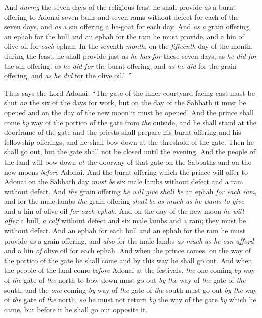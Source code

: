 \begin{biblechapter}
\verse And \textit{during} the seven days of the religious feast he shall provide \textit{as} a burnt offering to Adonai seven bulls and seven rams without defect for each of the seven days, and \textit{as} a sin offering a he-goat for each day.
\verse And \textit{as a} grain offering, an ephah for the bull and an ephah for the ram he must provide, and a hin of olive oil for \textit{each} ephah.
\verse In the seventh \textit{month}, on the \textit{fifteenth} day of the month, during the feast, he shall provide just as \textit{he has for} these seven days, as \textit{he did for} the sin offering, \textit{as he did for} the burnt offering, and \textit{as he did} for the grain offering, and \textit{as he did} for the olive oil.’ ”
\end{biblechapter}

\begin{biblechapter} %
\verse Thus says the Lord Adonai: “The gate of the inner courtyard facing east must be shut \textit{on} the six of the days for work, but on the day of the Sabbath it must be opened and on the day of the new moon it must be opened.
\verse And the prince shall come \textit{by} way of the portico of the gate from \textit{the} outside, and he shall stand at the doorframe of the gate and the priests shall prepare his burnt offering and his fellowship offerings, and he shall bow down at the threshold of the gate. Then he shall go out, but the gate shall not be closed until the evening.
\verse And the people of the land will bow down \textit{at} the doorway of that gate on the Sabbaths and on the new moons \textit{before} Adonai.
\verse And the burnt offering which the prince will offer to Adonai on the Sabbath day \textit{must be} six male lambs without defect and a ram without defect.
\verse And \textit{the} grain offering \textit{he will give} \textit{shall be} an ephah \textit{for each ram}, and for the male lambs \textit{the} grain offering \textit{shall be} \textit{as much as he wants to give} and a hin of olive oil \textit{for each ephah}.
\verse And on the day of the new moon \textit{he will offer} a bull, \textit{a calf} without defect and six male lambs and a ram; they must be without defect.
\verse And an ephah for each bull and an ephah for the ram he must provide \textit{as} a grain offering, and \textit{also} for the male lambs \textit{as much as he can afford} and a hin \textit{of} olive oil for each ephah.
\verse And when the prince comes, on the way of the portico of the gate he shall come and by this way he shall go out.
\verse And when the people of the land come \textit{before} Adonai at the festivals, \textit{the} one coming \textit{by} way of \textit{the} gate of \textit{the} north to bow down must go out \textit{by} \textit{the} way of \textit{the} gate of \textit{the} south, and the \textit{one} coming \textit{by} way of \textit{the} gate of \textit{the} south must go out \textit{by the} way of \textit{the} gate of \textit{the} north, \textit{so} he must not return \textit{by} the way of the gate \textit{by} which he came, but before it he shall go out opposite it.

\end{biblechapter}

